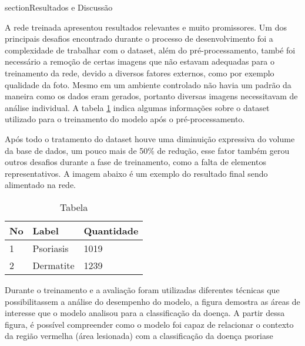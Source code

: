 section{Resultados e Discussão}

A rede treinada apresentou resultados relevantes e muito promissores. Um dos principais desafios encontrado durante o processo de desenvolvimento foi a complexidade de trabalhar com o dataset, além do pré-processamento, també foi necessário a remoção de certas imagens que não estavam adequadas para o treinamento da rede, devido a diversos fatores externos, como por exemplo qualidade da foto. Mesmo em um ambiente controlado não havia um padrão da maneira como os dados eram gerados, portanto diversas imagens necessitavam de análise individual. A tabela \ref{tab:db-table} indica algumas informações sobre o dataset utilizado para o treinamento do modelo após o pré-processamento. 

Após todo o tratamento do dataset houve uma diminuição expressiva do volume da base de dados, um pouco mais de 50\% de redução, esse fator também gerou outros desafios durante a fase de treinamento, como a falta de elementos representativos. A imagem abaixo é um exemplo do resultado final sendo alimentado na rede.

\newline
\begin{table}[h]
  \centering
  \begin{tabular}{lll}
  \hline
  \multicolumn{1}{|l|}{No} & \multicolumn{1}{l|}{Label} & \multicolumn{1}{l|}{Quantidade} \\ \hline
  1                        & Psoriasis                  & 1019                            \\
  2                        & Dermatite                  & 1239                            \\
  \end{tabular}
  \caption{Tabela }
  \label{tab:db-table}
\end{table}


Durante o treinamento e a avaliação foram utilizadas diferentes técnicas que possibilitassem a análise do desempenho do modelo, a figura demostra as áreas de interesse que o modelo analisou para a classificação da doença. A partir dessa figura, é possível compreender como o modelo foi capaz de relacionar o contexto da região vermelha (área lesionada) com a classificação da doença psoriase


\newpage


